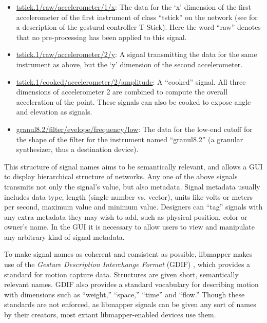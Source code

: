 	\begin{itemize}
	\item\url{tstick.1/raw/accelerometer/1/x}: The data for the `x' dimension of the first accelerometer of the first instrument of class ``tstick'' on the network (see  for a description of the gestural controller T-Stick). Here the word ``raw'' denotes that no pre-processing has been applied to this signal. 
	\item\url{tstick.1/raw/accelerometer/2/y}: A signal transmitting the data for the same instrument as above, but the `y' dimension of the second accelerometer.
	\item\url{tstick.1/cooked/accelerometer/2/amplitude}: A ``cooked'' signal. All three dimensions of accelerometer 2 are combined to compute the overall acceleration of the point. These signals can also be cooked to expose angle and elevation as signals.
	\item\url{granul8.2/filter/evelope/frequency/low}: The data for the low-end cutoff for the shape of the filter for the instrument named ``granul8.2'' (a granular synthesizer, thus a destination device).
	\end{itemize}

This structure of signal names aims to be semantically relevant, and allows a GUI to display hierarchical structure of networks. Any one of the above signals transmits not only the signal's value, but also metadata. Signal metadata usually includes data type, length (single number vs. vector), units like volts or meters per second, maximum value and minimum value. Designers can ``tag'' signals with any extra metadata they may wish to add, such as physical position, color or owner's name. In the GUI it is necessary to allow users to view and manipulate any arbitrary kind of signal metadata.

To make signal names as coherent and consistent as possible, libmapper makes use of the \emph{Gesture Description Interchange Format} (GDIF) , which provides a standard for motion capture data. Structures are given short, semantically relevant names. GDIF also provides a standard vocabulary for describing motion with dimensions such as ``weight,'' ``space,'' ``time'' and ``flow.'' Though these standards are not enforced, as libmapper signals can be given any sort of names by their creators, most extant libmapper-enabled devices use them.


